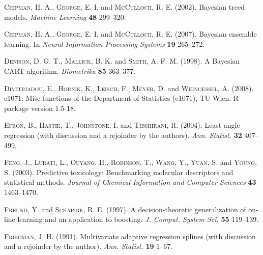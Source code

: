 \documentclass[aoas,nameyear,dvips]{arximspdf}
\begin{document}
\begin{thebibliography}{99}
\textsc{Chipman}, H. A., \textsc{George}, E. I. and \textsc{McCulloch}, R. E.  (2002).
Bayesian treed models. \textit{Machine Learning} \textbf{48} 299--320.

\textsc{Chipman}, H. A., \textsc{George}, E. I. and \textsc{McCulloch}, R. E.  (2007). Bayesian ensemble learning. In \textit{Neural Information
  Processing Systems} \textbf{19} 265--272.

\textsc{Denison}, D. G. T., \textsc{Mallick}, B. K. and \textsc{Smith}, A. F. M.  (1998).
A {B}ayesian {CART} algorithm. \textit{Biometrika}
  \textbf{85} 363--377.

\textsc{Dimitriadou}, E., \textsc{Hornik}, K., \textsc{Leisch}, F., \textsc{Meyer}, D.  and \textsc{Weingessel},
  A.  (2008). e1071: Misc functions of the
  Department of Statistics (e1071), TU Wien.
\newblock R package version 1.5-18.

\textsc{Efron}, B., \textsc{Hastie}, T., \textsc{Johnstone}, I. and \textsc{Tibshirani}, R.  (2004).
Least angle regression (with discussion and a rejoinder by the authors). \textit{Ann. Statist.}
\textbf{32} 407--499.

\textsc{Feng}, J., \textsc{Lurati}, L., \textsc{Ouyang}, H., \textsc{Robinson}, T., \textsc{Wang}, Y., \textsc{Yuan}, S. and
  \textsc{Young}, S.  (2003). Predictive toxicology:
  Benchmarking molecular descriptors and statistical methods. \textit{Journal of
  Chemical Information and Computer Sciences} \textbf{43} 1463--1470.

\textsc{Freund}, Y. and \textsc{Schapire}, R. E.  (1997). A
  decision-theoretic generalization of on-line learning and an application to
  boosting. \textit{J. Comput. System Sci.} \textbf{55} 119--139.

\textsc{Friedman}, J. H.  (1991). Multivariate adaptive
  regression splines (with discussion and a rejoinder by the author). \textit{Ann. Statist.} \textbf{19} 1--67.


\end{thebibliography}
\end{document}
